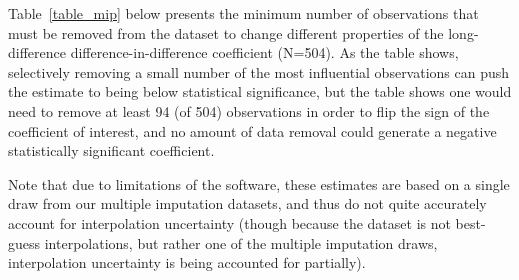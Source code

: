 \documentclass[12pt]{article}
\begin{document}
Table~\ref{table_mip} below presents the minimum number of observations that must be removed from the dataset to change different properties of the long-difference difference-in-difference coefficient (N=504). As the table shows, selectively removing a small number of the most influential observations can push the estimate to being below statistical significance, but the table shows one would need to remove at least 94 (of 504) observations in order to flip the sign of the coefficient of interest, and no amount of data removal could generate a negative statistically significant coefficient.

Note that due to limitations of the \cite{broderick2021} software, these estimates are based on a single draw from our multiple imputation datasets, and thus do not quite accurately account for interpolation uncertainty (though because the dataset is not best-guess interpolations, but rather one of the multiple imputation draws, interpolation uncertainty is being accounted for partially).
















\clearpage
\newpage
\singlespacing
{}




\end{document}

